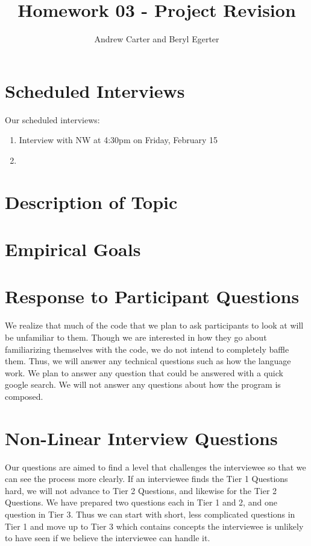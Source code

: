 \documentclass{article}
\title{Homework 03 - Project Revision}
\author{Andrew Carter and Beryl Egerter}
\begin{document}
\maketitle
\section{Scheduled Interviews}
Our scheduled interviews:
\begin{enumerate}
  \item Interview with NW at 4:30pm on Friday, February 15
  \item
\end{enumerate}
\section{Description of Topic}

\section{Empirical Goals}

\section{Response to Participant Questions}
We realize that much of the code that we plan to ask participants to look at will be unfamiliar to them. Though we are interested in how they go about familiarizing themselves with the code, we do not intend to completely baffle them. Thus, we will answer any technical questions such as how the language work. We plan to answer any question that could be answered with a quick google search. We will not answer any questions about how the program is composed.



\section{Non-Linear Interview Questions}
Our questions are aimed to find a level that challenges the interviewee so that we can see the process more clearly. If an interviewee finds the Tier 1 Questions hard, we will not advance to Tier 2 Questions, and likewise for the Tier 2 Questions. We have prepared two questions each in Tier 1 and 2, and one question in Tier 3. Thus we can start with short, less complicated questions in Tier 1 and move up to Tier 3 which contains concepts the interviewee is unlikely to have seen if we believe the interviewee can handle it.
\end{document}
